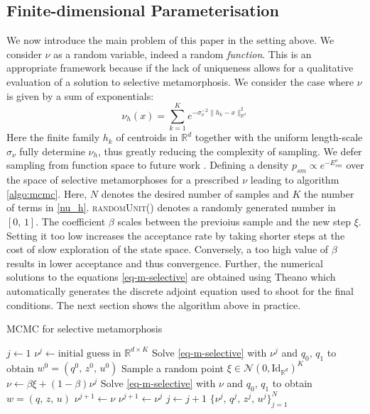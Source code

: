 \documentclass[runningheads]{llncs}
\newcommand{\Rd}{\mathbb{R}^{d}}
\newcommand{\RdK}{\mathbb{R}^{d\times K}}
\begin{document}
\subsection{Finite-dimensional Parameterisation}\label{subs:finite-dim-param}

We now introduce the main problem of this paper in the setting above. We
consider $\nu$ as a random variable, indeed a random \emph{function}. This is an
appropriate framework because if the lack of uniqueness allows for a qualitative
evaluation of a solution to selective metamorphosis. We consider the case where
$\nu$ is given by a sum of exponentials:
\begin{equation}\label{nu_h}
    \nu_h (x) = \sum_{k=1}^K e^{ -\sigma_\nu^{-2}\|h_k - x\|_{\Rd}^2}
\end{equation}
Here the finite family $h_k$ of centroids in $\Rd$ together with the uniform
length-scale $\sigma_\nu$ fully determine $\nu_h$, thus greatly reducing the
complexity of sampling. We defer sampling from function space to future work
\cite{bockarnaudoncotter2019}. Defining a density $p_{sm} \propto e^{-
E_{sm}^\nu}$ over the space of selective metamorphoses for a prescribed $\nu$
leading to algorithm \ref{algo:mcmc}. Here, $N$ denotes the desired number of
samples and $K$ the number of terms in \eqref{nu_h}. \textsc{randomUnit()}
denotes a randomly generated number in $[0,\,1]$. The coefficient $\beta$ scales
between the previoius sample and the new step $\xi$. Setting it too low
increases the acceptance rate by taking shorter steps at the cost of slow
exploration of the state space. Conversely, a too high value of $\beta$ results
in lower acceptance and thus convergence. Further, the numerical solutions to
the equations \eqref{eq-m-selective} are obtained using Theano
\cite{team2016theano} which automatically generates the discrete adjoint
equation used to shoot for the final conditions. The next section shows the
algorithm above in practice.
\begin{algorithm}[h!]
\begin{algorithmic}
\caption{MCMC for selective metamorphosis}\label{algo:mcmc}
\Procedure{mcmcSM}{$N$, $K$, $\mathbf q_0$, $\mathbf q_1$, $\beta\in (0,1]$}
\State $j \gets 1$
\State $\nu^j \gets \text{initial guess in } \RdK$
\State Solve \eqref{eq-m-selective} with $\nu^j$ and $q_0,\,q_1$ to obtain $w^0 = (q^0,\, z^0,\, u^0)$
\State Sample a random point $\xi \in \mathcal N(0, \text{Id}_{\mathbb R^d})^K$
\State $\nu \gets \beta \xi + (1-\beta) \nu^j$
\State Solve \eqref{eq-m-selective} with $\nu$ and $q_0,\,q_1$ to obtain $w = (q,\, z,\, u)$
    \State $\nu^{j+1} \gets \nu$
\Else
    \State $\nu^{j+1} \gets \nu^j$
\EndIf
\State $j\gets j+1$
\EndWhile
\Return $\{\nu^j,\, q^j,\, z^j,\, u^j\}_{j=1}^N$
\EndProcedure
\end{algorithmic}
\end{algorithm}
\end{document}
